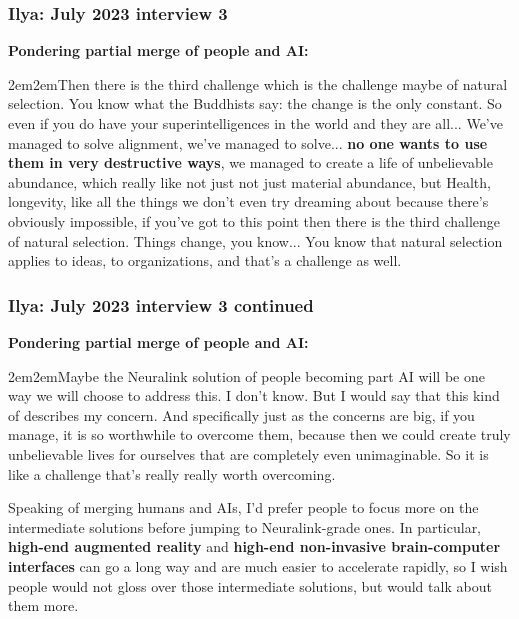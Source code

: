 \documentclass{beamer}
\newenvironment{customquote}
  {\begin{adjustwidth}{2em}{2em}\noindent\textnormal}
  {\end{adjustwidth}}
\begin{document}
\begin{frame}

  \frametitle{Ilya: July 2023 interview 3}

{\bf Pondering partial merge of people and AI:}\\[2ex]

\begin{customquote}
Then there is the third challenge which is the challenge maybe of natural selection. You know what the Buddhists say: the change is the only constant. So even if you do have your superintelligences in the world and they are all... We've managed to solve alignment, we've managed to solve... {\bf no one wants to use them in very destructive ways}, we managed to create a life of unbelievable abundance, which really like not just not just material abundance, but Health, longevity, like all the things we don't even try dreaming about because there's obviously impossible, if you've got to this point then there is the third challenge of natural selection. Things change, you know... You know that natural selection applies to ideas, to organizations, and that's a challenge as well.
\end{customquote}

\end{frame}

\begin{frame}

  \frametitle{Ilya: July 2023 interview 3 continued}

{\bf Pondering partial merge of people and AI:}\\[2ex]

\begin{customquote}
Maybe the Neuralink solution of people becoming part AI will be one way we will choose to address this. I don't know. But I would say that this kind of describes my concern. And specifically just as the concerns are big, if you manage, it is so worthwhile to overcome them, because then we could create truly unbelievable lives for ourselves that are completely even unimaginable. So it is like a challenge that's really really worth overcoming.\\[2ex]
\end{customquote}

{\footnotesize Speaking of merging humans and AIs, I'd prefer people to focus more on the intermediate solutions before jumping to Neuralink-grade ones. In particular, {\bf high-end augmented reality} and {\bf high-end non-invasive brain-computer interfaces} can go a long way and are much easier to accelerate rapidly, so I wish people would not gloss over those intermediate solutions, but would talk about them more.}

\end{frame}
\end{document}
